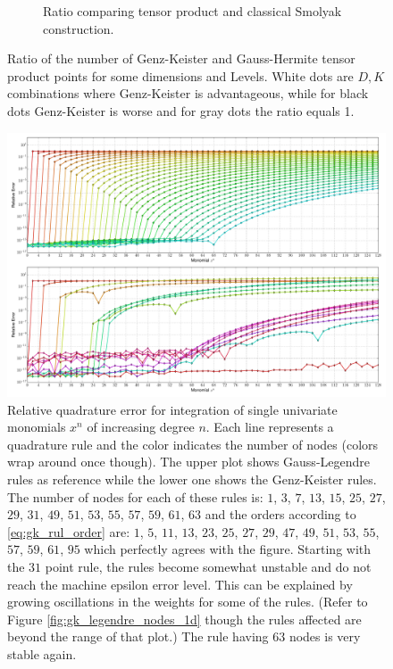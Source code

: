 \documentclass[a4paper,10pt]{article}
\begin{document}
\begin{figure}
\begin{subfigure}[b]{\linewidth}
    \caption{Ratio comparing tensor product and classical Smolyak construction.}
    \label{fig:smol_hermitephy_ratio}
  \end{subfigure}
  \caption{Ratio of the number of Genz-Keister and Gauss-Hermite tensor pro\-duct
  points for some dimensions and Levels.
  White dots are $D,K$ combinations where Genz-Keister is advantageous,
  while for black dots Genz-Keister is worse and for gray dots the ratio equals 1.}
\end{figure}

\clearpage

\begin{figure}
  \centering
  \includegraphics[width=\linewidth]{./img/monomial_errors_legendre.pdf}
  \caption{Relative quadrature error for integration of single univariate monomials $x^n$ of increasing degree $n$.
  Each line represents a quadrature rule and the color indicates the number of nodes (colors wrap around once though).
  The upper plot shows Gauss-Legendre rules as reference while the lower one shows the Genz-Keister rules.
  The number of nodes for each of these rules is:
  $1$, $3$,  $7$, $13$, $15$, $25$, $27$, $29$, $31$, $49$, $51$, $53$, $55$, $57$, $59$, $61$, $63$
  and the orders according to \eqref{eq:gk_rul_order} are:
  $1$, $5$, $11$, $13$, $23$, $25$, $27$, $29$, $47$, $49$, $51$, $53$, $55$, $57$, $59$, $61$, $95$
  which perfectly agrees with the figure.
  Starting with the $31$ point rule, the rules become somewhat unstable
  and do not reach the machine epsilon error level. This can be explained
  by growing oscillations in the weights for some of the rules. (Refer to Figure
  \ref{fig:gk_legendre_nodes_1d} though the rules affected are beyond the range
  of that plot.) The rule having $63$ nodes is very stable again.}
  \label{fig:monomial_errors_legendre}
\end{figure}
\end{document}
